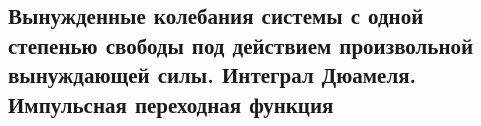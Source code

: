 

\subsection{Вынужденные колебания системы с одной степенью свободы под действием произвольной вынуждающей силы. Интеграл Дюамеля. Импульсная переходная функция}



